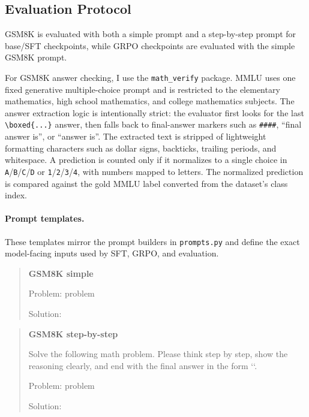 \documentclass[11pt]{article}
\begin{document}
\subsection{Evaluation Protocol}
GSM8K is evaluated with both a simple prompt and a step-by-step prompt for base/SFT checkpoints, while GRPO checkpoints are evaluated with the simple GSM8K prompt. 

For GSM8K answer checking, I use the \texttt{math\_verify} package. MMLU uses one fixed generative multiple-choice prompt and is restricted to the elementary mathematics, high school mathematics, and college mathematics subjects. The answer extraction logic is intentionally strict: the evaluator first looks for the last \verb|\boxed{...}| answer, then falls back to final-answer markers such as \texttt{\#\#\#\#}, ``final answer is'', or ``answer is''. The extracted text is stripped of lightweight formatting characters such as dollar signs, backticks, trailing periods, and whitespace. A prediction is counted only if it normalizes to a single choice in \texttt{A}/\texttt{B}/\texttt{C}/\texttt{D} or \texttt{1}/\texttt{2}/\texttt{3}/\texttt{4}, with numbers mapped to letters. The normalized prediction is compared against the gold MMLU label converted from the dataset's class index.

\paragraph{Prompt templates.}
These templates mirror the prompt builders in \texttt{prompts.py} and define the exact model-facing inputs used by SFT, GRPO, and evaluation.

\begin{quote}
\small
\textbf{GSM8K simple}
\begin{answerbox}
Problem:
{problem}

Solution:
\end{answerbox}
\end{quote}

\begin{quote}
\small
\textbf{GSM8K step-by-step}
\begin{answerbox}
Solve the following math problem. Please think step by step, show the reasoning
clearly, and end with the final answer in the form ``.

Problem:
{problem}

Solution:
\end{answerbox}
\end{quote}
\end{document}
